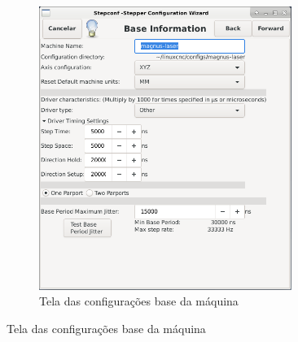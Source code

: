 \documentclass[
	article,			%
	11pt,				%
	oneside,			%
	a4paper,			%
	section=TITLE,		%
	english,			%
	brazil,				%
	sumario=tradicional
	]{abntex2}
\begin{document}
\begin{figure}[H]
\begin{subfigure}[b]{0.5\textwidth}
        \includegraphics[width=0.9\textwidth]{img/stepconf_base_info.png}
        \caption{Tela das configurações base da máquina}
        \label{fig:stepconf-base-config}
    \end{subfigure}%

    \vspace{1cm}
 

\end{figure}
\end{document}
